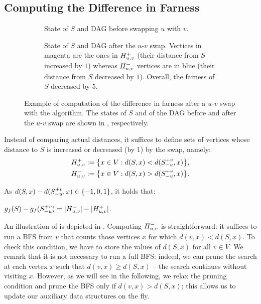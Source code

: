 \subsection{Computing the Difference in Farness}
%
\begin{figure}[t]
\begin{subfigure}[t]{\textwidth}

\captionsetup{singlelinecheck = false, justification=raggedright}
\caption{State of $S$ and DAG before swapping $u$ with $v$.}
\label{fig:local-swaps-farn-diff-before}
\end{subfigure}\bigskip

\begin{subfigure}[t]{\textwidth}

\caption{State of $S$ and DAG after the $u$-$v$ swap. Vertices
in magenta are the ones in $H_{u, v}^+$ (their distance from $S$ increased by $1$)
whereas $H_{u, v}^-$ vertices are in blue (their distance from $S$ decreased by
$1$). Overall, the farness of $S$ decreased by $5$.}
\label{fig:local-swaps-farn-diff-after}
\end{subfigure}
\caption{Example of computation of the difference in farness after a $u$-$v$
swap with the \localswaps algorithm.
The states of $S$ and of the DAG before and after the $u$-$v$ swap
are shown in ,
respectively.}
\label{fig:local-swaps-farn-diff}
\end{figure}

Instead of comparing actual distances, it suffices to define sets of vertices
whose distance to $S$ is increased or decreased (by 1) by the swap, namely:
%
\begin{align*}
    \Huvp &:= \set{x \in V : d(S, x) < d(\Suv, x)},\\
    \Huvm &:= \set{x \in V : d(S, x) > d(\Suv, x)}.
\end{align*}

As $d(S, x) - d(\Suv, x) \in \set{-1, 0 ,1}$, it holds that:

\begin{lemma}
\label{lemma:lsh-gc:farn-diff}
$g_f(S) - g_f(S_{-u}^{+v}) = |H_{u, v}^-| - |H_{u, v}^+|$.
\end{lemma}

An illustration of  is depicted
in .
%
Computing $H_{u, v}^-$ is straightforward: it suffices to run a BFS from $v$ that
counts those vertices $x$ for which $d(v, x) < d(S, x)$. To check this
condition, we have to store the values of $d(S, x)$ for all $v \in V$. We
remark that it is not necessary to run a full BFS: indeed, we can prune the
search at each vertex $x$ such that $d(v, x) \ge d(S, x)$ -- \ie the search
continues without visiting $x$. However, as we will see in the following, we
relax the pruning condition and prune the BFS only if $d(v, x) > d(S, x)$;
this allows us to update our auxiliary data structures on the fly.

